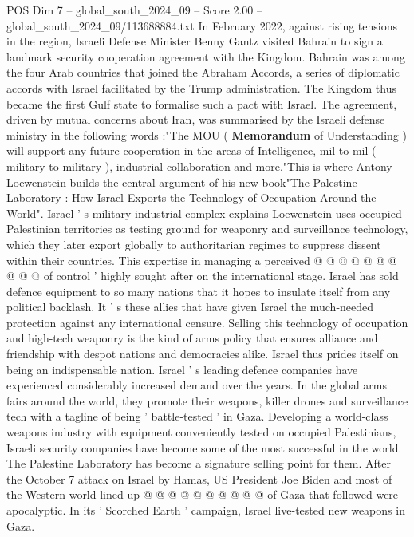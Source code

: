 \begin{textsample}{POS Dim 7 – global\_south\_2024\_09 – Score 2.00 – global\_south\_2024\_09/113688884.txt}  \label{ex:f7_pos_277}
In February 2022, against rising tensions in the region, Israeli Defense Minister Benny Gantz visited Bahrain to sign a landmark security cooperation agreement with the Kingdom.
Bahrain was among the four Arab countries that joined the Abraham Accords, a series of diplomatic accords with Israel facilitated by the Trump administration.
The Kingdom thus became the first Gulf state to formalise such a pact with Israel.
The agreement, driven by mutual concerns about Iran, was summarised by the Israeli defense ministry in the following words :"The MOU ( \textbf{Memorandum} of Understanding ) will support any future cooperation in the areas of Intelligence, mil-to-mil ( military to military ), industrial collaboration and more."This is where Antony Loewenstein builds the central argument of his new book"The Palestine Laboratory : How Israel Exports the Technology of Occupation Around the World".
Israel ' s military-industrial complex explains Loewenstein uses occupied Palestinian territories as testing ground for weaponry and surveillance technology, which they later export globally to authoritarian regimes to suppress dissent within their countries.
This expertise in managing a perceived @ @ @ @ @ @ @ @ @ @ of control ' highly sought after on the international stage.
Israel has sold defence equipment to so many nations that it hopes to insulate itself from any political backlash.
It ' s these allies that have given Israel the much-needed protection against any international censure.
Selling this technology of occupation and high-tech weaponry is the kind of arms policy that ensures alliance and friendship with despot nations and democracies alike.
Israel thus prides itself on being an indispensable nation.
Israel ' s leading defence companies have experienced considerably increased demand over the years.
In the global arms fairs around the world, they promote their weapons, killer drones and surveillance tech with a tagline of being ' battle-tested ' in Gaza.
Developing a world-class weapons industry with equipment conveniently tested on occupied Palestinians, Israeli security companies have become some of the most successful in the world.
The Palestine Laboratory has become a signature selling point for them.
After the October 7 attack on Israel by Hamas, US President Joe Biden and most of the Western world lined up @ @ @ @ @ @ @ @ @ @ of Gaza that followed were apocalyptic.
In its ' Scorched Earth ' campaign, Israel live-tested new weapons in Gaza.

\end{textsample}

